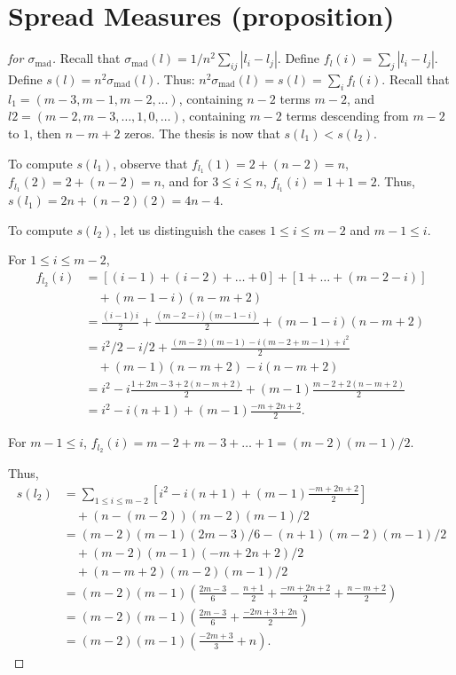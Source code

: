 \documentclass[version=3.21, pagesize, twoside=off, bibliography=totoc, DIV=calc, fontsize=12pt, a4paper]{scrartcl}
\begin{document}
\section{Spread Measures (proposition)}
\newcommand{\smad}{\sigma_\text{mad}}
\begin{proof}[for $\smad$]
	Recall that $\smad(l) = 1/n^2 \sum_{ij} |l_i - l_j|$.
	Define $f_l(i) = \sum_j |l_i - l_j|$.
	Define $s(l) = n^2 \smad(l)$. Thus: $n^2 \smad(l) = s(l) = \sum_i f_l(i)$.
	Recall that $l_1 = (m-3, m-1, m-2, …)$, containing $n-2$ terms $m-2$, and $l2 = (m-2, m - 3, …, 1, 0, …)$, containing $m-2$ terms descending from $m-2$ to $1$, then $n - m + 2$ zeros.
	The thesis is now that $s(l_1) < s(l_2)$.
	
	To compute $s(l_1)$, observe that $f_{l_1}(1) = 2 + (n - 2) = n$, $f_{l_1}(2) = 2 + (n - 2) = n$, and for $3 ≤ i ≤ n$, $f_{l_1}(i) = 1 + 1 = 2$. Thus, $s(l_1) = 2n + (n - 2) (2) = 4n - 4$.
	
	To compute $s(l_2)$, let us distinguish the cases $1 ≤ i ≤ m - 2$ and $m - 1 ≤ i$.
	
	For $1 ≤ i ≤ m - 2$, 
	\begin{align}
		f_{l_2}(i) &= [(i - 1) + (i - 2) + … + 0] + [1 + … + (m - 2 - i)] \\
		&\quad + (m - 1 - i) (n - m + 2)\\
		&= \frac{(i - 1) i}{2} + \frac{(m - 2 - i) (m - 1 - i)}{2} + (m - 1 - i) (n - m + 2)\\
		&= i^2 / 2 - i / 2 + \frac{(m - 2) (m - 1) - i (m - 2 + m - 1) + i^2}{2} \\
		&\quad + (m - 1) (n - m + 2) - i (n - m + 2)\\
		&= i^2 - i \frac{1 + 2m - 3 + 2(n - m + 2)}{2} + (m - 1) \frac{m - 2 + 2 (n - m + 2)}{2}\\
		&= i^2 - i (n + 1) + (m - 1) \frac{-m + 2n + 2}{2}.
	\end{align}
	
	For $m - 1 ≤ i$, $f_{l_2}(i) = m - 2 + m - 3 + … + 1 = (m - 2) (m - 1) / 2$.
	
	Thus, 
	\begin{align}
		s(l_2) &= \sum_{1 ≤ i ≤ m - 2}[i^2 - i (n + 1) + (m - 1) \frac{-m + 2n + 2}{2}] \\
		&\quad + (n - (m - 2)) (m - 2) (m - 1) / 2\\
		&= (m - 2) (m - 1) (2m - 3) / 6 - (n + 1) (m - 2) (m - 1) / 2 \\
		&\quad + (m - 2) (m - 1) (- m + 2n + 2) / 2 \\
		&\quad + (n - m + 2) (m - 2) (m - 1) / 2\\
		&= (m - 2) (m - 1) \left(\frac{2m - 3}{6} - \frac{n + 1}{2} + \frac{- m + 2n + 2}{2} + \frac{n - m + 2}{2}\right)\\
		&= (m - 2) (m - 1) \left(\frac{2m - 3}{6} + \frac{- 2m + 3 + 2n}{2}\right)\\
		&= (m - 2) (m - 1) \left(\frac{-2m + 3}{3} + n\right).
	\end{align}
		

\end{proof}
\end{document}
